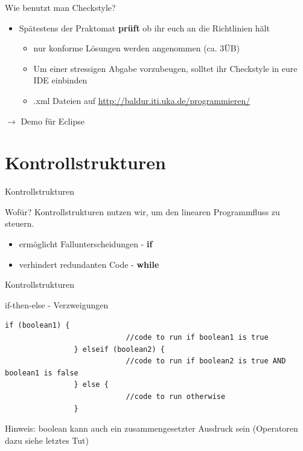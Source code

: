 \documentclass[18pt]{beamer}
\begin{document}
\begin{frame}[fragile]{Wie benutzt man Checkstyle?}
\begin{itemize}

	\item Spätestens der Praktomat \textbf{prüft} ob ihr euch an die Richtlinien hält
	\begin{itemize}
			\item nur konforme Lösungen werden angenommen (ca. 3ÜB)
			\item Um einer stressigen Abgabe vorzubeugen, solltet ihr Checkstyle in eure IDE einbinden
			\item .xml Dateien auf \hyperlink{http://baldur.iti.uka.de/programmieren/}{http://baldur.iti.uka.de/programmieren/}
			
	\end{itemize}
\end{itemize}
\begin{center}
$\to$ Demo für Eclipse
\end{center}
\end{frame}

\section{Kontrollstrukturen}

\begin{frame}[fragile]{Kontrollstrukturen}
	\begin{block}{Wofür?}
	Kontrollstrukturen nutzen wir, um den linearen Programmfluss zu steuern.
		\begin{itemize}
			\item ermöglicht Fallunterscheidungen - \textbf{if}
			\item verhindert redundanten Code - \textbf{while}
		\end{itemize}
	\end{block}
\end{frame}

\begin{frame}[fragile]{Kontrollstrukturen}
\begin{exampleblock}{if-then-else - Verzweigungen}
	\begin{lstlisting}[basicstyle=\scriptsize]
				if (boolean1) {
							//code to run if boolean1 is true
				} elseif (boolean2) {
							//code to run if boolean2 is true AND boolean1 is false
				} else {
							//code to run otherwise
				}
	\end{lstlisting}
\end{exampleblock}
Hinweis: boolean kann auch ein zusammengesetzter Ausdruck sein
(Operatoren dazu siehe letztes Tut)
\end{frame}
\end{document}
